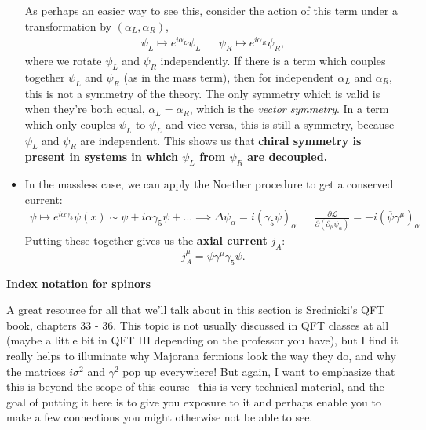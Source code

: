 \documentclass[12pt, oneside]{article}   	%
\theoremstyle{definition}
\begin{document}
\begin{itemize}
	As perhaps an easier way to see this, consider the action of this term under a transformation by $(\alpha_L, \alpha_R)$,
	\begin{align}
		\psi_L\mapsto e^{i\alpha_L} \psi_L && \psi_R\mapsto e^{i\alpha_R} \psi_R,
	\end{align}
	where we rotate $\psi_L$ and $\psi_R$ independently. If there is a term which couples together $\psi_L$ and $\psi_R$ (as in the mass term), then for independent $\alpha_L$ and $\alpha_R$, this is not a symmetry of the theory. The only symmetry which is valid is when they're both equal, $\alpha_L = \alpha_R$, which is the \textit{vector symmetry}. In a term which only couples $\psi_L$ to $\psi_L$ and vice versa, this is still a symmetry, because $\psi_L$ and $\psi_R$ are independent. This shows us that \textbf{chiral symmetry is present in systems in which $\psi_L$ from $\psi_R$ are decoupled.}
	
	\item In the massless case, we can apply the Noether procedure to get a conserved current:
	\begin{align} 
		\psi \mapsto e^{i\alpha\gamma_5} \psi(x)\sim \psi + i\alpha\gamma_5 \psi + ... \implies \Delta\psi_\alpha = i(\gamma_5\psi)_\alpha &&
		\frac{\partial\mathcal L}{\partial (\partial_\mu\psi_\alpha)} = -i (\overline\psi \gamma^\mu)_\alpha
	 \end{align}
	Putting these together gives us the \textbf{axial current} $j_A$:
	\begin{equation}
		j_A^\mu = \overline\psi \gamma^\mu\gamma_5 \psi.
	\end{equation}
	
\end{itemize}
	
\textbf{Index notation for spinors}

A great resource for all that we'll talk about in this section is Srednicki's QFT book, chapters 33 - 36. This topic is not usually discussed in QFT classes at all (maybe a little bit in QFT III depending on the professor you have), but I find it really helps to illuminate why Majorana fermions look the way they do, and why the matrices $i\sigma^2$ and $\gamma^2$ pop up everywhere! But again, I want to emphasize that this is beyond the scope of this course-- this is very technical material, and the goal of putting it here is to give you exposure to it and perhaps enable you to make a few connections you might otherwise not be able to see. 
\end{document}

